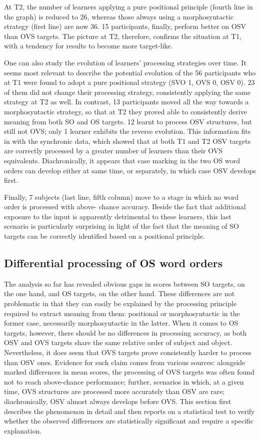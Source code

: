 At T2, the number of learners applying a pure positional principle (fourth line in the graph) is reduced to 26, whereas those always using a morphosyntactic strategy (first line) are now 36. 15 participants, finally, perform better on OSV than OVS targets. The picture at T2, therefore, confirms the situation at T1, with a tendency for results to become more target-like.

One can also study the evolution of learners' processing strategies over time. It seems most relevant to describe the potential evolution of the 56 participants who at T1 were found to adopt a pure positional strategy (SVO 1, OVS 0, OSV 0). 23 of them did not change their processing strategy, consistently applying the same strategy at T2 as well. In contrast, 13 participants moved all the way towards a morphosyntactic strategy, so that at T2 they proved able to consistently derive meaning from both SO and OS targets. 12 learnt to process OSV structures, but still not OVS; only 1 learner exhibits the reverse evolution. This information fits in with the synchronic data, which showed that at both T1 and T2 OSV targets are correctly processed by a greater number of learners than their OVS equivalents. Diachronically, it appears that case marking in the two OS word orders can develop either at same time, or separately, in which case OSV develops first. 

Finally, 7 subjects (last line, fifth column) move to a stage in which no word order is processed with  above- chance accuracy. Beside the fact that additional exposure to the input is apparently detrimental to these learners, this last scenario is particularly surprising in light of the fact that the meaning of SO targets can be correctly identified based on a positional principle.

\subsection{Differential processing of OS word orders}\label{sec:05:2.5}

The analysis so far has revealed obvious gaps in scores between SO targets, on the one hand, and OS targets, on the other hand. These differences are not problematic in that they can easily be explained by the processing principle required to extract meaning from them: positional or morphosyntactic in the former case, necessarily morphosyntactic in the latter. When it comes to OS targets, however, there should be no differences in processing accuracy, as both OSV and OVS targets share the same relative order of subject and object. Nevertheless, it does seem that OVS targets prove consistently harder to process than OSV ones. Evidence for such claim comes from various sources: alongside marked differences in mean scores, the processing of OVS targets was often found not to reach above-chance performance; further, scenarios in which, at a given time, OVS structures are processed more accurately than OSV are rare; diachronically, OSV almost always develops before OVS. This section first describes the phenomenon in detail and then reports on a statistical test to verify whether the observed differences are statistically significant and require a specific explanation.

